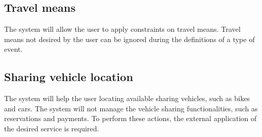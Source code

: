 \subsection{Travel means}
The system will allow the user to apply constraints on travel means.
\newline
Travel means not desired by the user can be ignored during the definitions of a type of event.

\subsection{Sharing vehicle location}
The system will help the user locating available sharing vehicles, such as bikes and cars.
\newline
The system will not manage the vehicle sharing functionalities, such as reservations and payments. To perform these actions, the external application of the desired service is required.
